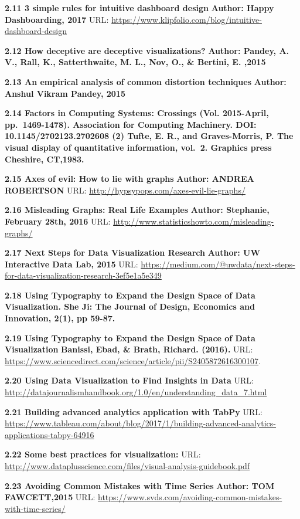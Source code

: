 \documentclass[]{book}
\theoremstyle{definition}
\theoremstyle{definition}
\theoremstyle{definition}
\theoremstyle{remark}
\begin{document}
\textbf{2.11 3 simple rules for intuitive dashboard design}
\textbf{Author: Happy Dashboarding, 2017 } URL:
\url{https://www.klipfolio.com/blog/intuitive-dashboard-design}

\textbf{2.12 How deceptive are deceptive visualizations?}
\textbf{Author: Pandey, A. V., Rall, K., Satterthwaite, M. L., Nov, O.,
\& Bertini, E. ,2015 }

\textbf{2.13 An empirical analysis of common distortion techniques}
\textbf{Author: Anshul Vikram Pandey, 2015 }

\textbf{2.14 Factors in Computing Systems: Crossings (Vol. 2015-April,
pp.~1469-1478). Association for Computing Machinery. DOI:
10.1145/2702123.2702608 (2) Tufte, E. R., and Graves-Morris, P. The
visual display of quantitative information, vol.~2. Graphics press
Cheshire, CT,1983.}

\textbf{2.15 Axes of evil: How to lie with graphs} \textbf{Author:
ANDREA ROBERTSON} URL: \url{http://hypsypops.com/axes-evil-lie-graphs/}

\textbf{2.16 Misleading Graphs: Real Life Examples} \textbf{Author:
Stephanie, February 28th, 2016} URL:
\url{http://www.statisticshowto.com/misleading-graphs/}

\textbf{2.17 Next Steps for Data Visualization Research} \textbf{Author:
UW Interactive Data Lab, 2015} URL:
\url{https://medium.com/@uwdata/next-steps-for-data-visualization-research-3ef5e1a5e349}

\textbf{2.18 Using Typography to Expand the Design Space of Data
Visualization. She Ji: The Journal of Design, Economics and Innovation,
2(1), pp 59-87.}

\textbf{2.19 Using Typography to Expand the Design Space of Data
Visualization} \textbf{Banissi, Ebad, \& Brath, Richard. (2016). } URL:
\url{https://www.sciencedirect.com/science/article/pii/S2405872616300107}.

\textbf{2.20 Using Data Visualization to Find Insights in Data} URL:
\url{http://datajournalismhandbook.org/1.0/en/understanding_data_7.html}

\textbf{2.21 Building advanced analytics application with TabPy} URL:
\url{https://www.tableau.com/about/blog/2017/1/building-advanced-analytics-applications-tabpy-64916}

\textbf{2.22 Some best practices for visualization:} URL:
\url{http://www.dataplusscience.com/files/visual-analysis-guidebook.pdf}

\textbf{2.23 Avoiding Common Mistakes with Time Series} \textbf{Author:
TOM FAWCETT,2015} URL:
\url{https://www.svds.com/avoiding-common-mistakes-with-time-series/}
\end{document}
